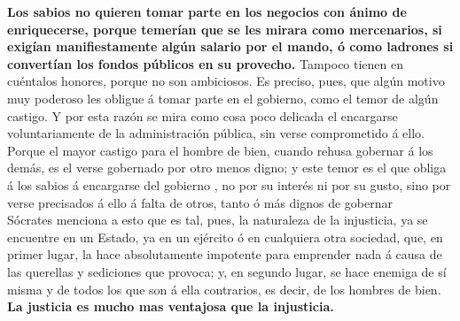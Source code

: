 \documentclass[10pt]{book}
\begin{document}
\textbf{Los sabios no quieren tomar parte en los negocios con ánimo de enriquecerse, porque temerían que se les mirara como mercenarios, si exigían manifiestamente algún salario por el mando, ó como ladrones si convertían los fondos públicos en su provecho.} Tampoco tienen en cuéntalos honores, porque no son ambiciosos.  Es preciso, pues, que algún motivo muy poderoso les obligue á tomar parte en el gobierno, como el temor de algún castigo. Y por esta razón se mira como cosa poco delicada el encargarse voluntariamente de la administración pública, sin verse comprometido á ello. Porque el mayor castigo para el hombre de bien, cuando rehusa gobernar á los demás, es el verse gobernado por otro menos digno; y este temor es el que obliga á los sabios á encargarse del gobierno , no por su interés ni por su gusto, sino por verse precisados á ello á falta de otros, tanto ó más dignos de gobernar\\
Sócrates menciona a esto que es tal, pues, la naturaleza de la injusticia, ya se encuentre en un Estado, ya en un ejército ó en cualquiera otra sociedad, que, en primer lugar, la hace absolutamente  impotente para emprender nada á causa de las querellas y sediciones que provoca; y, en segundo lugar, se hace enemiga de sí misma y de todos los que son á ella contrarios, es decir, de los hombres de bien.\\ \textbf{La justicia es mucho mas ventajosa que la injusticia.}
\end{document}
